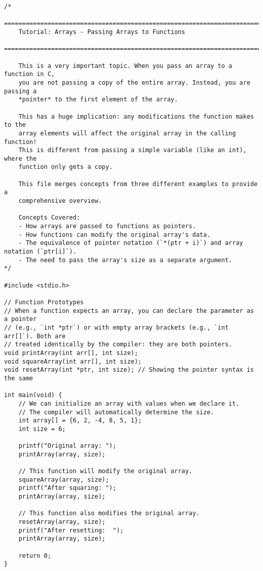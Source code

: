 \documentclass[11pt]{book}
\begin{document}
\begin{verbatim}
/*
    ================================================================================
    Tutorial: Arrays - Passing Arrays to Functions
    ================================================================================

    This is a very important topic. When you pass an array to a function in C,
    you are not passing a copy of the entire array. Instead, you are passing a
    *pointer* to the first element of the array.

    This has a huge implication: any modifications the function makes to the
    array elements will affect the original array in the calling function!
    This is different from passing a simple variable (like an int), where the
    function only gets a copy.

    This file merges concepts from three different examples to provide a
    comprehensive overview.

    Concepts Covered:
    - How arrays are passed to functions as pointers.
    - How functions can modify the original array's data.
    - The equivalence of pointer notation (`*(ptr + i)`) and array notation (`ptr[i]`).
    - The need to pass the array's size as a separate argument.
*/

#include <stdio.h>

// Function Prototypes
// When a function expects an array, you can declare the parameter as a pointer
// (e.g., `int *ptr`) or with empty array brackets (e.g., `int arr[]`). Both are
// treated identically by the compiler: they are both pointers.
void printArray(int arr[], int size);
void squareArray(int arr[], int size);
void resetArray(int *ptr, int size); // Showing the pointer syntax is the same

int main(void) {
    // We can initialize an array with values when we declare it.
    // The compiler will automatically determine the size.
    int array[] = {6, 2, -4, 8, 5, 1};
    int size = 6;

    printf("Original array: ");
    printArray(array, size);

    // This function will modify the original array.
    squareArray(array, size);
    printf("After squaring: ");
    printArray(array, size);

    // This function also modifies the original array.
    resetArray(array, size);
    printf("After resetting:  ");
    printArray(array, size);

    return 0;
}


\end{verbatim}
\end{document}
